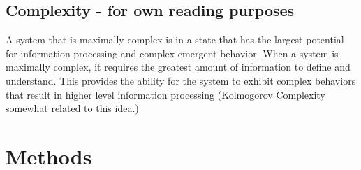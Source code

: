 \documentclass{article}
\begin{document}
\subsection{Complexity - for own reading purposes}
A system that is maximally complex is in a state that has the largest potential for information processing and complex emergent behavior. When a system is maximally complex, it requires the greatest amount of information to define and understand. This provides the ability for the system to exhibit complex behaviors that result in higher level information processing (Kolmogorov Complexity somewhat related to this idea.)

\section{Methods}
\end{document}
